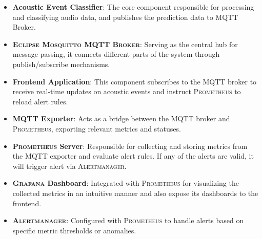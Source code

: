 \begin{itemize}
  \item \textbf{Acoustic Event Classifier}: The core component responsible for processing and classifying audio data, and publishes the prediction data to MQTT Broker.
  \item \textbf{\textsc{Eclipse Mosquitto MQTT Broker}}: Serving as the central hub for message passing, it connects different parts of the system through publish/subscribe mechanisms.
  \item \textbf{Frontend Application}: This component subscribes to the MQTT broker to receive real-time updates on acoustic events and instruct \textsc{Prometheus} to reload alert rules.
  \item \textbf{MQTT Exporter}: Acts as a bridge between the MQTT broker and \textsc{Prometheus}, exporting relevant metrics and statuses.
  \item \textbf{\textsc{Prometheus} Server}: Responsible for collecting and storing metrics from the MQTT exporter and evaluate alert rules. If any of the alerts are valid, it will trigger alert via \textsc{Alertmanager}.
  \item \textbf{\textsc{Grafana} Dashboard}: Integrated with \textsc{Prometheus} for visualizing the collected metrics in an intuitive manner and also expose its dashboards to the frontend.
  \item \textbf{\textsc{Alertmanager}}: Configured with \textsc{Prometheus} to handle alerts based on specific metric thresholds or anomalies.
\end{itemize}

